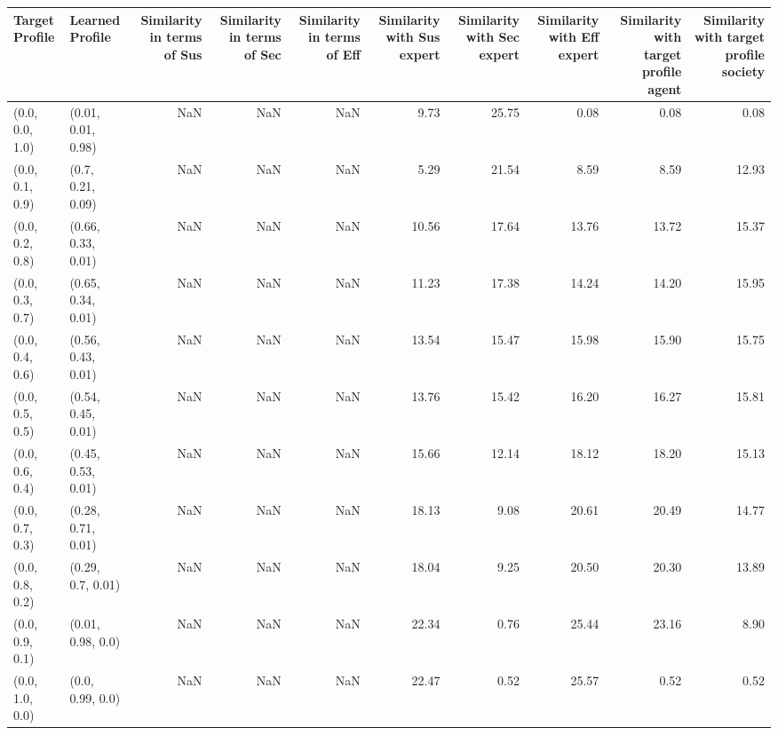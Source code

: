 \begin{tabular}{llrrrrrrrr}
\toprule
Target Profile & Learned Profile & Similarity in terms of Sus & Similarity in terms of Sec & Similarity in terms of Eff & Similarity with Sus expert & Similarity with Sec expert & Similarity with Eff expert & Similarity with target profile agent & Similarity with target profile society \\
\midrule
(0.0, 0.0, 1.0) & (0.01, 0.01, 0.98) & NaN & NaN & NaN & 9.73 & 25.75 & 0.08 & 0.08 & 0.08 \\
(0.0, 0.1, 0.9) & (0.7, 0.21, 0.09) & NaN & NaN & NaN & 5.29 & 21.54 & 8.59 & 8.59 & 12.93 \\
(0.0, 0.2, 0.8) & (0.66, 0.33, 0.01) & NaN & NaN & NaN & 10.56 & 17.64 & 13.76 & 13.72 & 15.37 \\
(0.0, 0.3, 0.7) & (0.65, 0.34, 0.01) & NaN & NaN & NaN & 11.23 & 17.38 & 14.24 & 14.20 & 15.95 \\
(0.0, 0.4, 0.6) & (0.56, 0.43, 0.01) & NaN & NaN & NaN & 13.54 & 15.47 & 15.98 & 15.90 & 15.75 \\
(0.0, 0.5, 0.5) & (0.54, 0.45, 0.01) & NaN & NaN & NaN & 13.76 & 15.42 & 16.20 & 16.27 & 15.81 \\
(0.0, 0.6, 0.4) & (0.45, 0.53, 0.01) & NaN & NaN & NaN & 15.66 & 12.14 & 18.12 & 18.20 & 15.13 \\
(0.0, 0.7, 0.3) & (0.28, 0.71, 0.01) & NaN & NaN & NaN & 18.13 & 9.08 & 20.61 & 20.49 & 14.77 \\
(0.0, 0.8, 0.2) & (0.29, 0.7, 0.01) & NaN & NaN & NaN & 18.04 & 9.25 & 20.50 & 20.30 & 13.89 \\
(0.0, 0.9, 0.1) & (0.01, 0.98, 0.0) & NaN & NaN & NaN & 22.34 & 0.76 & 25.44 & 23.16 & 8.90 \\
(0.0, 1.0, 0.0) & (0.0, 0.99, 0.0) & NaN & NaN & NaN & 22.47 & 0.52 & 25.57 & 0.52 & 0.52 \\
\bottomrule
\end{tabular}
